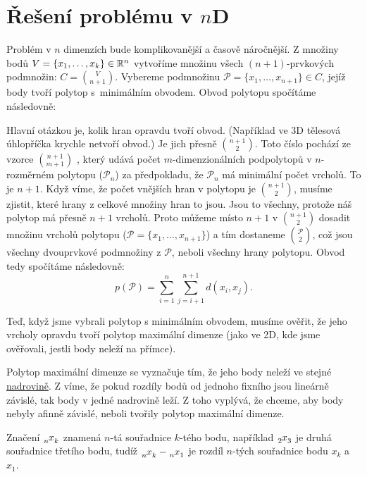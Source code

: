 \section{Řešení problému v \texorpdfstring{$n$D}{nD}}
\label{sec:reseni_1D}

Problém v $n$ dimenzích bude komplikovanější a časově náročnější. Z množiny bodů $V = \{x_1,\ldots, x_k\} \in \mathbb{R}^n$ vytvoříme množinu všech $(n+1)$-prvkových podmnožin: $C = \binom{V}{n+1}$. Vybereme podmnožinu $\mathcal{P} = \{x_1, \dots, x_{n+1}\} \in C$, jejíž body tvoří polytop s~minimálním obvodem. Obvod polytopu spočítáme následovně:

Hlavní otázkou je, kolik hran opravdu tvoří obvod. (Například ve $3$D tělesová úhlopříčka krychle netvoří obvod.) Je jich přesně $\binom{n+1}{2}$. Toto číslo pochází ze vzorce $\binom{n+1}{m+1}$ \autocite[120]{coxeter1973regular},
který udává počet $m$-dimenzionál\-ních podpolytopů v $n$-rozměrném polytopu ($\mathcal{P}_n$) za předpokladu, že $\mathcal{P}_n$ má minimální počet vrcholů. To je $n+1$. 
Když víme, že počet vnějších hran v polytopu je $\binom{n+1}{2}$, musíme zjistit, které hrany z celkové množiny hran to jsou. Jsou to všechny, protože náš polytop má přesně $n+1$ vrcholů. Proto můžeme místo $n+1$ v $\binom{n+1}{2}$ dosadit množinu vrcholů polytopu ($\mathcal{P} = \{x_1, \dots, x_{n+1}\}$) a tím dostaneme $\binom{\mathcal{P}}{2}$, což jsou všechny dvouprvkové podmnožiny z $\mathcal{P}$, neboli všechny hrany polytopu. Obvod tedy spočítáme následovně:
\begin{equation*}
  p(\mathcal{P}) = \sum_{i=1}^{n} \sum_{j=i+1}^{n+1}d(x_i, x_{j}).
\end{equation*}

Teď, když jsme vybrali polytop s minimálním obvodem, musíme ověřit, že jeho vrcholy opravdu tvoří polytop maximální dimenze (jako ve 2D, kde jsme ověřovali, jestli body neleží na přímce).

Polytop maximální dimenze se vyznačuje tím, že jeho body neleží ve stejné \hyperref[definice:nadrovina]{nadrovině}. Z  víme, že pokud rozdíly bodů od jednoho fixního jsou lineárně závislé, tak body v jedné nadrovině leží. Z toho vyplývá, že chceme, aby body nebyly afinně závislé, neboli tvořily polytop maximální dimenze.  

\begin{poznamka} 
  \label{poznamka:varovani_index}
  Značení $\x{n}{k}$ znamená $n$-tá souřadnice $k$-tého bodu, například $\x{2}{3}$ je dru\-há souřadnice třetího bodu, tudíž $\x{n}{k} - \x{n}{1}$ je rozdíl $n$-tých souřadnice bodu $x_k$ a $x_1$. 
\end{poznamka}

